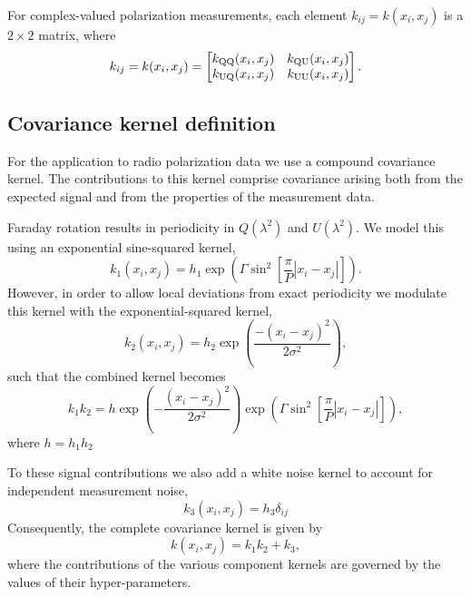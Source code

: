 \documentclass[fleqn,usenatbib]{mnras}
\begin{document}
For complex-valued polarization measurements, each element $k_{ij} = k(x_i, x_j)$ is a $2 \times 2$ matrix, where
%
\begin{equation}
k_{ij} = k(x_i, x_j) = \begin{bmatrix} k_{\rm QQ}(x_i,x_j) & k_{\rm QU}(x_i,x_j) \\ k_{\rm UQ}(x_i,x_j) & k_{\rm UU}(x_i,x_j) \end{bmatrix}.
\end{equation}
%


\subsection{Covariance kernel definition}
\label{sec:kernels}

For the application to radio polarization data we use a compound covariance kernel. The contributions to this kernel comprise covariance arising both from the expected signal and from the properties of the measurement data. 

Faraday rotation results in periodicity in $Q(\lambda^2)$ and $U(\lambda^2)$. We model this using an exponential sine-squared kernel,
%
\begin{equation}
\label{eq:expsinsq}
k_1(x_i,x_j)=h_1 \exp \left( \Gamma \sin^2 \left[ \frac{\pi}{P}|x_i - x_j|\right] \right).
\end{equation}
%
However, in order to allow local deviations from exact periodicity we modulate this kernel with the exponential-squared kernel,
%
\begin{equation}
\label{eq:expsq}
k_2(x_i,x_j)=h_2 \exp \left( \frac{ -(x_i - x_j)^2}{2\sigma^2} \right),
\end{equation}
%
such that the combined kernel becomes
%
\begin{equation}
\label{eq:combkernel}
k_1 k_2 =h \exp \left( - \frac{(x_i - x_j)^2}{2 \sigma^2} \right) \exp \left( \Gamma \sin^2 \left[ \frac{\pi}{P}|x_i - x_j|\right] \right),
\end{equation}
%
where $h = h_1 h_2$

To these signal contributions we also add a white noise kernel to account for independent measurement noise,
%
\begin{equation}
\label{eq:noisekernel}
k_3(x_i,x_j)= h_3 \delta_{ij}
\end{equation}
%
Consequently, the complete covariance kernel is given by
%
\begin{equation}
k(x_i,x_j) = k_1 k_2 + k_3,
\end{equation}
%
where the contributions of the various component kernels are governed by the values of their hyper-parameters.
\end{document}
